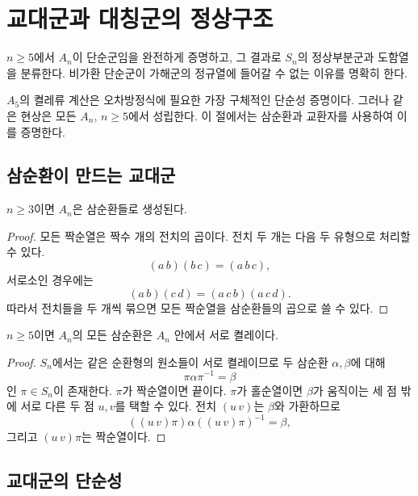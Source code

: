 \clearpage
\section{교대군과 대칭군의 정상구조}
\label{sec:alternating-symmetric-structure}

\begin{learninggoal}
$n\ge5$에서 $A_n$이 단순군임을 완전하게 증명하고, 그 결과로 $S_n$의 정상부분군과 도함열을 분류한다. 비가환 단순군이 가해군의 정규열에 들어갈 수 없는 이유를 명확히 한다.
\end{learninggoal}

$A_5$의 켤레류 계산은 오차방정식에 필요한 가장 구체적인 단순성 증명이다. 그러나 같은 현상은 모든 $A_n$, $n\ge5$에서 성립한다. 이 절에서는 삼순환과 교환자를 사용하여 이를 증명한다.

\subsection{삼순환이 만드는 교대군}

\begin{proposition}
\label{prop:an-generated-three-cycles}
$n\ge3$이면 $A_n$은 삼순환들로 생성된다.
\end{proposition}

\begin{proof}
모든 짝순열은 짝수 개의 전치의 곱이다. 전치 두 개는 다음 두 유형으로 처리할 수 있다.
\[
  (a\,b)(b\,c)=(a\,b\,c),
\]
서로소인 경우에는
\[
  (a\,b)(c\,d)=(a\,c\,b)(a\,c\,d).
\]
따라서 전치들을 두 개씩 묶으면 모든 짝순열을 삼순환들의 곱으로 쓸 수 있다.
\end{proof}

\begin{lemma}
\label{lem:three-cycles-conjugate-an}
$n\ge5$이면 $A_n$의 모든 삼순환은 $A_n$ 안에서 서로 켤레이다.
\end{lemma}

\begin{proof}
$S_n$에서는 같은 순환형의 원소들이 서로 켤레이므로 두 삼순환 $\alpha,\beta$에 대해
\[
  \pi\alpha\pi^{-1}=\beta
\]
인 $\pi\in S_n$이 존재한다. $\pi$가 짝순열이면 끝이다. $\pi$가 홀순열이면 $\beta$가 움직이는 세 점 밖에 서로 다른 두 점 $u,v$를 택할 수 있다. 전치 $(u\,v)$는 $\beta$와 가환하므로
\[
  ((u\,v)\pi)\alpha((u\,v)\pi)^{-1}=\beta,
\]
그리고 $(u\,v)\pi$는 짝순열이다.
\end{proof}

\subsection{교대군의 단순성}

